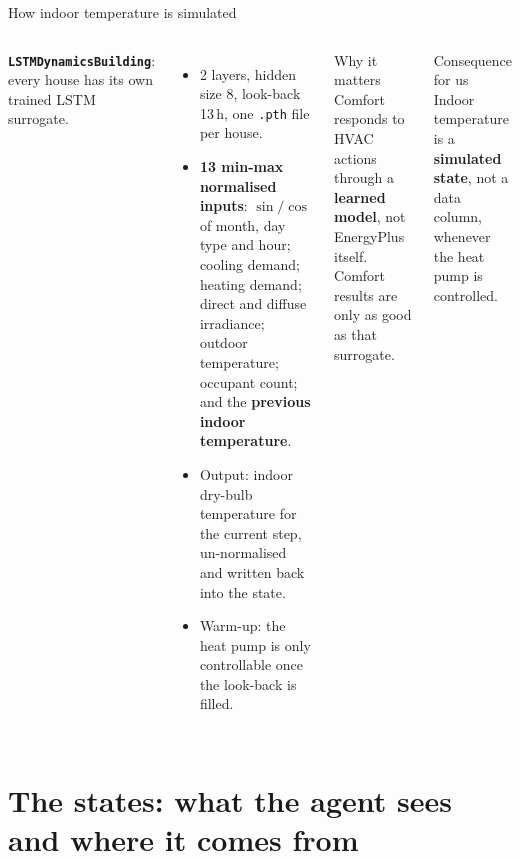 \documentclass[aspectratio=169,10pt]{beamer}
\begin{document}
\begin{frame}{How indoor temperature is simulated}
\begin{columns}[T]
\textbf{\texttt{LSTMDynamicsBuilding}}: every house has its own trained LSTM surrogate.
\begin{itemize}
  \item 2 layers, hidden size 8, look-back 13\,h, one \texttt{.pth} file per house.
  \item \textbf{13 min-max normalised inputs}: $\sin/\cos$ of month, day type and hour; cooling demand; heating demand; direct and diffuse irradiance; outdoor temperature; occupant count; and the \textbf{previous indoor temperature}.
  \item Output: indoor dry-bulb temperature for the current step, un-normalised and written back into the state.
  \item Warm-up: the heat pump is only controllable once the look-back is filled.
\end{itemize}
\begin{block}{Why it matters}
Comfort responds to HVAC actions through a \textbf{learned model}, not EnergyPlus itself. Comfort results are only as good as that surrogate.
\end{block}
\begin{block}{Consequence for us}
Indoor temperature is a \textbf{simulated state}, not a data column, whenever the heat pump is controlled.
\end{block}
\end{columns}
\end{frame}

\section{The states: what the agent sees and where it comes from}
\end{document}
